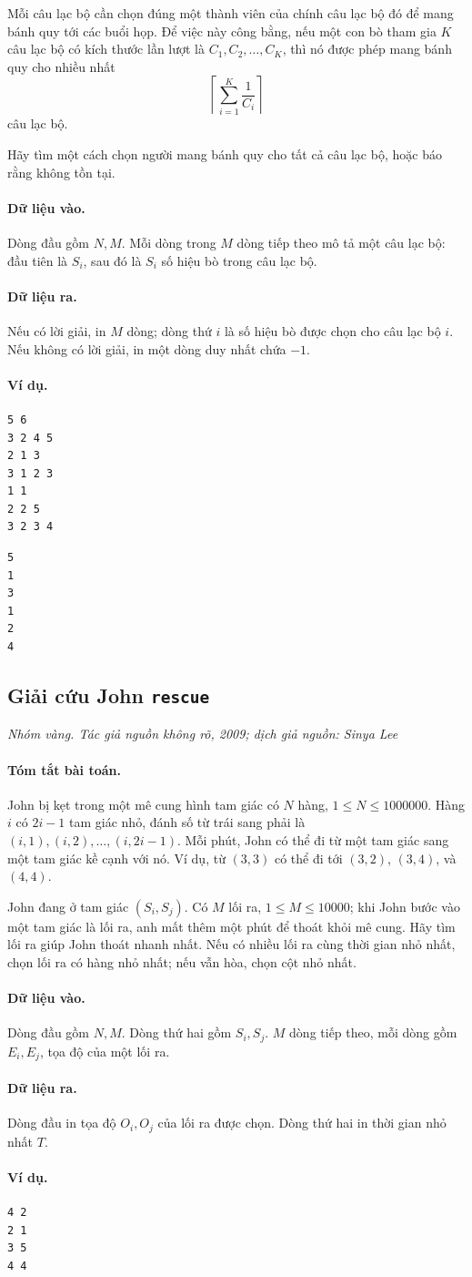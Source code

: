 \documentclass[11pt]{article}
\newcommand{\problem}[4]{%
  \subsection[#1 (#2)]{#1 \hfill {\normalsize\texttt{#2}}}%
  \noindent\textit{#3. #4}\par\smallskip
}
\newcommand{\iosec}[1]{\paragraph{#1}}
\begin{document}
Mỗi câu lạc bộ cần chọn đúng một thành viên của chính câu lạc bộ đó để mang
bánh quy tới các buổi họp. Để việc này công bằng, nếu một con bò tham gia
\(K\) câu lạc bộ có kích thước lần lượt là \(C_1,C_2,\ldots,C_K\), thì nó
được phép mang bánh quy cho nhiều nhất
\[
\left\lceil\sum_{i=1}^K \frac{1}{C_i}\right\rceil
\]
câu lạc bộ.

Hãy tìm một cách chọn người mang bánh quy cho tất cả câu lạc bộ, hoặc báo
rằng không tồn tại.

\iosec{Dữ liệu vào.}
Dòng đầu gồm \(N,M\). Mỗi dòng trong \(M\) dòng tiếp theo mô tả một câu lạc
bộ: đầu tiên là \(S_i\), sau đó là \(S_i\) số hiệu bò trong câu lạc bộ.

\iosec{Dữ liệu ra.}
Nếu có lời giải, in \(M\) dòng; dòng thứ \(i\) là số hiệu bò được chọn cho
câu lạc bộ \(i\). Nếu không có lời giải, in một dòng duy nhất chứa \(-1\).

\iosec{Ví dụ.}
\begin{verbatim}
5 6
3 2 4 5
2 1 3
3 1 2 3
1 1
2 2 5
3 2 3 4
\end{verbatim}

\begin{verbatim}
5
1
3
1
2
4
\end{verbatim}

\problem{Giải cứu John}{rescue}{Nhóm vàng}{Tác giả nguồn không rõ, 2009; dịch giả nguồn: Sinya Lee}

\iosec{Tóm tắt bài toán.}
John bị kẹt trong một mê cung hình tam giác có \(N\) hàng,
\(1\le N\le 1000000\). Hàng \(i\) có \(2i-1\) tam giác nhỏ, đánh số từ trái
sang phải là \((i,1),(i,2),\ldots,(i,2i-1)\). Mỗi phút, John có thể đi từ
một tam giác sang một tam giác kề cạnh với nó. Ví dụ, từ \((3,3)\) có thể đi
tới \((3,2)\), \((3,4)\), và \((4,4)\).

John đang ở tam giác \((S_i,S_j)\). Có \(M\) lối ra,
\(1\le M\le 10000\); khi John bước vào một tam giác là lối ra, anh mất thêm
một phút để thoát khỏi mê cung. Hãy tìm lối ra giúp John thoát nhanh nhất.
Nếu có nhiều lối ra cùng thời gian nhỏ nhất, chọn lối ra có hàng nhỏ nhất;
nếu vẫn hòa, chọn cột nhỏ nhất.

\iosec{Dữ liệu vào.}
Dòng đầu gồm \(N,M\). Dòng thứ hai gồm \(S_i,S_j\). \(M\) dòng tiếp theo,
mỗi dòng gồm \(E_i,E_j\), tọa độ của một lối ra.

\iosec{Dữ liệu ra.}
Dòng đầu in tọa độ \(O_i,O_j\) của lối ra được chọn. Dòng thứ hai in thời
gian nhỏ nhất \(T\).

\iosec{Ví dụ.}
\begin{verbatim}
4 2
2 1
3 5
4 4
\end{verbatim}
\end{document}

